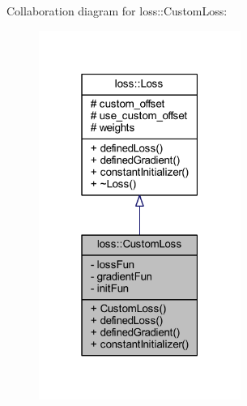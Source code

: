 Collaboration diagram for loss\+:\+:Custom\+Loss\+:\nopagebreak
\begin{figure}[H]
\begin{center}
\leavevmode
\includegraphics[width=187pt]{classloss_1_1_custom_loss__coll__graph}
\end{center}
\end{figure}
